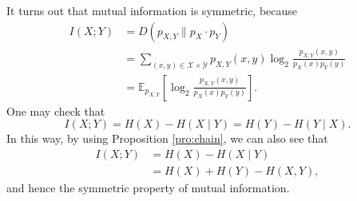 \documentclass[math, code]{amznotes}
\theoremstyle{remark}
\begin{document}
It turns out that mutual information is symmetric, because 
\begin{align*}
    I\left(X ; Y\right) & = D\left(p_{X, Y} \parallel p_X \cdot p_Y\right) \\
    & = \sum_{(x, y) \in \mathcal{X} \times \mathcal{Y}}p_{X, Y}(x, y)\log_2\frac{p_{X, Y}(x, y)}{p_X(x)p_Y(y)} \\
    & = \mathbb{E}_{p_{X, Y}}\left[\log_2\frac{p_{X, Y}(x, y)}{p_X(x)p_Y(y)}\right].
\end{align*}
One may check that 
\begin{equation*}
    I\left(X ; Y\right) = H\left(X\right) - H\left(X \mid Y\right) = H\left(Y\right) - H\left(Y \mid X\right).
\end{equation*}
In this way, by using Proposition \ref{pro:chain}, we can also see that 
\begin{align*}
    I\left(X ; Y\right) & = H\left(X\right) - H\left(X \mid Y\right) \\
    & = H\left(X\right) + H\left(Y\right) - H\left(X, Y\right),
\end{align*}
and hence the symmetric property of mutual information.
\end{document}
